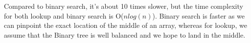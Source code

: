 \documentclass[a4paper,11pt]{article}
\begin{document}
Compared to binary search, it's about 10 times slower, but the time complexity for both lookup and binary search is O($nlog(n)$). Binary search is faster as we can pinpoint the exact location of the middle of an array, whereas for lookup, we assume that the Binary tree is well balanced and we hope to land in the middle.
\end{document}
